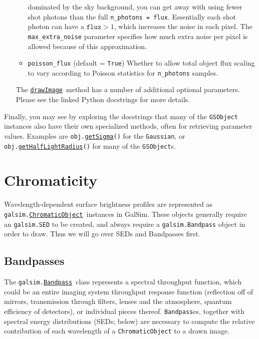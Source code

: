 \documentclass[preprint,10pt]{../../devel/modules/aastex}
\newcommand\ChromaticObject{\href{http://galsim-developers.github.io/GalSim/classgalsim_1_1chromatic_1_1_chromatic_object.html}{\texttt{ChromaticObject}}}
\newcommand\drawImage{\href{http://galsim-developers.github.io/GalSim/classgalsim_1_1base_1_1_g_s_object.html\#aafe6ca9d84fe81543fbc105b897273db}{\texttt{drawImage}}}
\newcommand\Bandpass{\href{http://galsim-developers.github.io/GalSim/classgalsim_1_1bandpass_1_1_bandpass.html}{\texttt{Bandpass}}}
\begin{document}
\begin{itemize}
\begin{itemize}
      dominated by the sky background, you can get away with using fewer
      shot photons than the full \texttt{n\_photons = flux}.  Essentially
      each shot photon can have a $\texttt{flux} > 1$, which increases the
      noise in each pixel.  The \texttt{max\_extra\_noise} parameter
      specifies how much extra noise per pixel is allowed because of this
      approximation.
    \item \texttt{poisson\_flux} (default = \texttt{True}) \newline
      Whether to allow total object flux scaling to vary according to
      Poisson statistics for \texttt{n\_photons} samples.
  \end{itemize}
  The \drawImage\ method has a number of additional optional
  parameters.  Please see the linked Python docstrings for more
  details.
\end{itemize}

Finally, you may see by exploring the docstrings that many of the \texttt{GSObject}
instances also have their own specialized methods, often for
retrieving parameter values. Examples are
  \texttt{obj.}\href{http://galsim-developers.github.io/GalSim/classgalsim_1_1base_1_1_gaussian.html#a418f2826a7b8934cfedc181de23ce826}{\texttt{getSigma}}\texttt{()}
for the \texttt{Gaussian}, or
  \texttt{obj.}\href{http://galsim-developers.github.io/GalSim/classgalsim_1_1base_1_1_sersic.html#ad6ca39293c6b478fc052d07ea51d086f}{\texttt{getHalfLightRadius}}\texttt{()}
for many of the \texttt{GSObject}s.

\section{Chromaticity}\label{sect:chromaticity}

Wavelength-dependent surface brightness profiles are represented as
\texttt{galsim.}\ChromaticObject\ instances in GalSim.
These objects generally require an \texttt{galsim.SED} to be created,
and always require a \texttt{galsim.Bandpass} object in order to draw.
Thus we will go over SEDs and Bandpasses first.

\subsection{Bandpasses}

The \texttt{galsim.}\Bandpass\ class represents a spectral throughput function, which could be an
entire imaging system throughput response function (reflection off of mirrors, transmission through
filters, lenses and the atmosphere, quantum efficiency of detectors), or individual pieces thereof.
\texttt{Bandpass}es, together with spectral energy distributions (SEDs; below) are necessary to
compute the relative contribution of each wavelength of a \texttt{ChromaticObject} to a drawn image.
\end{document}

